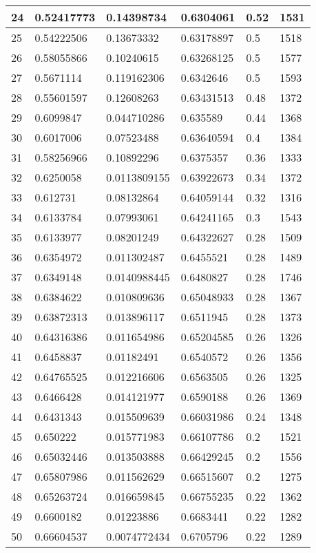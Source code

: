 \begin{longtable}{|l|l|l|l|l|l|}
24 & 0.52417773 & 0.14398734 & 0.6304061 & 0.52 & 1531 \\ \hline 
25 & 0.54222506 & 0.13673332 & 0.63178897 & 0.5 & 1518 \\ \hline 
26 & 0.58055866 & 0.10240615 & 0.63268125 & 0.5 & 1577 \\ \hline 
27 & 0.5671114 & 0.119162306 & 0.6342646 & 0.5 & 1593 \\ \hline 
28 & 0.55601597 & 0.12608263 & 0.63431513 & 0.48 & 1372 \\ \hline 
29 & 0.6099847 & 0.044710286 & 0.635589 & 0.44 & 1368 \\ \hline 
30 & 0.6017006 & 0.07523488 & 0.63640594 & 0.4 & 1384 \\ \hline 
31 & 0.58256966 & 0.10892296 & 0.6375357 & 0.36 & 1333 \\ \hline 
32 & 0.6250058 & 0.0113809155 & 0.63922673 & 0.34 & 1372 \\ \hline 
33 & 0.612731 & 0.08132864 & 0.64059144 & 0.32 & 1316 \\ \hline 
34 & 0.6133784 & 0.07993061 & 0.64241165 & 0.3 & 1543 \\ \hline 
35 & 0.6133977 & 0.08201249 & 0.64322627 & 0.28 & 1509 \\ \hline 
36 & 0.6354972 & 0.011302487 & 0.6455521 & 0.28 & 1489 \\ \hline 
37 & 0.6349148 & 0.0140988445 & 0.6480827 & 0.28 & 1746 \\ \hline 
38 & 0.6384622 & 0.010809636 & 0.65048933 & 0.28 & 1367 \\ \hline 
39 & 0.63872313 & 0.013896117 & 0.6511945 & 0.28 & 1373 \\ \hline 
40 & 0.64316386 & 0.011654986 & 0.65204585 & 0.26 & 1326 \\ \hline 
41 & 0.6458837 & 0.01182491 & 0.6540572 & 0.26 & 1356 \\ \hline 
42 & 0.64765525 & 0.012216606 & 0.6563505 & 0.26 & 1325 \\ \hline 
43 & 0.6466428 & 0.014121977 & 0.6590188 & 0.26 & 1369 \\ \hline 
44 & 0.6431343 & 0.015509639 & 0.66031986 & 0.24 & 1348 \\ \hline 
45 & 0.650222 & 0.015771983 & 0.66107786 & 0.2 & 1521 \\ \hline 
46 & 0.65032446 & 0.013503888 & 0.66429245 & 0.2 & 1556 \\ \hline 
47 & 0.65807986 & 0.011562629 & 0.66515607 & 0.2 & 1275 \\ \hline 
48 & 0.65263724 & 0.016659845 & 0.66755235 & 0.22 & 1362 \\ \hline 
49 & 0.6600182 & 0.01223886 & 0.6683441 & 0.22 & 1282 \\ \hline 
50 & 0.66604537 & 0.0074772434 & 0.6705796 & 0.22 & 1289 \\ \hline 
\end{longtable}